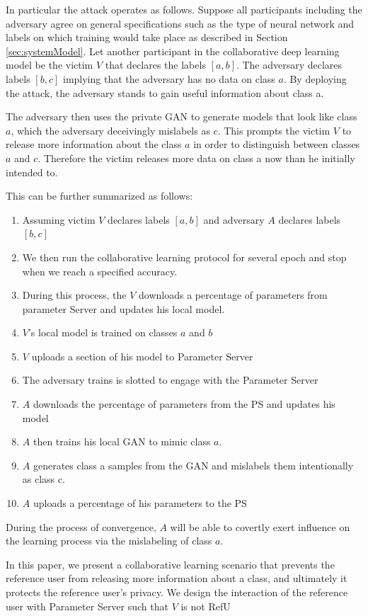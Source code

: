 \documentclass[conference]{IEEEtran}
\begin{document}
In particular the attack operates as follows. Suppose all participants including the adversary agree on general specifications such as
the type of neural network and labels on which training would take place as described in Section \ref{sec:systemModel}. Let another
participant in the collaborative deep learning
model be the victim $V$ that declares the labels $[a,b]$. The adversary declares labels $[b,c]$ implying that the adversary has no data
on class $a$. By deploying the attack, the adversary stands to gain useful information about class a.

The adversary then uses the private GAN to generate models that look like class $a$, which the adversary deceivingly mislabels as $c$.
This prompts the victim  $V$ to release more information about the class $a$ in order to distinguish between classes 
$a$ and $c$. Therefore the victim releases more data on class a now than he initially intended to.

This can be further summarized as follows:
\begin {enumerate}
\item Assuming victim $V$ declares labels $[a,b]$ and adversary $A$ declares labels $[b,c]$
\item We then run the collaborative learning protocol for several epoch and stop when we reach a specified accuracy.
\item During this process, the $V$ downloads a percentage of parameters from parameter Server and updates his local model.
\item $V$'s local model is trained on classes $a$ and $b$
\item $V$ uploads a section of his model to Parameter Server
\item The adversary trains is slotted to engage with the Parameter Server
\item $A$ downloads the percentage of parameters from the PS and updates his model
\item $A$ then trains his local GAN to mimic class $a$.
\item $A$ generates class a samples from the GAN and mislabels them intentionally as class c.
\item $A$ uploads a percentage of his parameters to the PS
\end {enumerate}
During the process of convergence, $A$ will be able to covertly exert influence on the learning process via the mislabeling of class
$a$.

In this paper, we present a collaborative learning scenario that prevents the reference user from releasing more
information about a class, and ultimately it protects the reference user's privacy. We design the interaction of the reference user
with Parameter Server such that $V$ is not RefU
\end{document}

